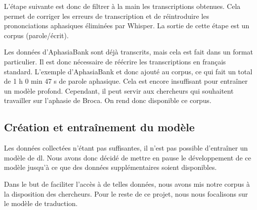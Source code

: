 L'étape suivante est donc de filtrer à la main les transcriptions obtenues.
Cela permet de corriger les erreurs de transcription 
et de réintroduire les prononciations aphasiques éliminées par Whisper.
La sortie de cette étape est un corpus (parole/écrit).

Les données d'AphasiaBank sont déjà transcrits, mais cela est fait dans un format particulier.
Il est donc nécessaire de réécrire les transcriptions en français standard.
L'exemple d'AphasiaBank et donc ajouté au corpus, ce qui fait un total de 1 h 0 min 47 s de parole aphasique.
Cela est encore insuffisant pour entraîner un modèle profond.
Cependant, il peut servir aux chercheurs qui souhaitent travailler sur l'aphasie de Broca.
On rend donc disponible ce corpus.

\subsection{Création et entraînement du modèle}

Les données collectées n'étant pas suffisantes,
il n'est pas possible d'entraîner un modèle de \gls{dl}.
Nous avons donc décidé de mettre en pause le développement de ce modèle 
jusqu'à ce que des données supplémentaires soient disponibles.

Dans le but de faciliter l'accès à de telles données,
nous avons mis notre corpus à la disposition des chercheurs.
Pour le reste de ce projet,
nous nous focalisons sur le modèle de traduction.